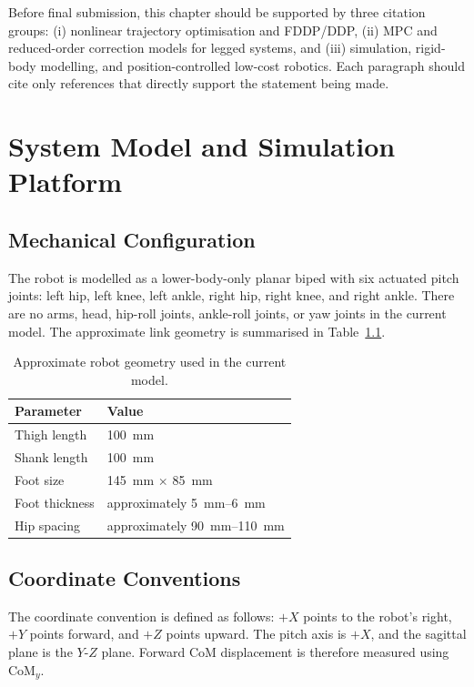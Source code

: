 \documentclass[12pt,a4paper]{report}
\begin{document}
Before final submission, this chapter should be supported by three citation groups: (i) nonlinear trajectory optimisation and FDDP/DDP, (ii) MPC and reduced-order correction models for legged systems, and (iii) simulation, rigid-body modelling, and position-controlled low-cost robotics. Each paragraph should cite only references that directly support the statement being made.
 
\chapter{System Model and Simulation Platform}\label{ch:system}
 
\section{Mechanical Configuration}
The robot is modelled as a lower-body-only planar biped with six actuated pitch joints: left hip, left knee, left ankle, right hip, right knee, and right ankle. There are no arms, head, hip-roll joints, ankle-roll joints, or yaw joints in the current model. The approximate link geometry is summarised in Table~\ref{tab:robot_geometry}.
 
\begin{table}[htbp]
\centering
\caption{Approximate robot geometry used in the current model.}
\label{tab:robot_geometry}
\begin{tabular}{@{}ll@{}}
\toprule
Parameter & Value \\
\midrule
Thigh length & \SI{100}{\milli\metre} \\
Shank length & \SI{100}{\milli\metre} \\
Foot size & \SI{145}{\milli\metre} $\times$ \SI{85}{\milli\metre} \\
Foot thickness & approximately \SIrange{5}{6}{\milli\metre} \\
Hip spacing & approximately \SIrange{90}{110}{\milli\metre} \\
\bottomrule
\end{tabular}
\end{table}
 
\section{Coordinate Conventions}
The coordinate convention is defined as follows: $+X$ points to the robot's right, $+Y$ points forward, and $+Z$ points upward. The pitch axis is $+X$, and the sagittal plane is the $Y$-$Z$ plane. Forward CoM displacement is therefore measured using $\mathrm{CoM}_y$.
 
\end{document}
